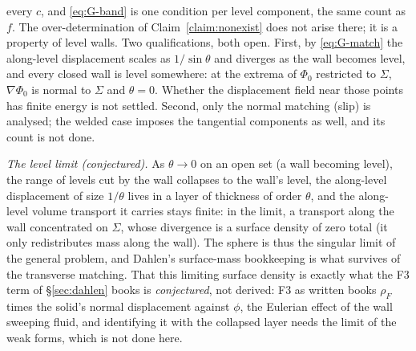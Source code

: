 \documentclass[11pt]{article}
\begin{document}
every $c$, and \eqref{eq:G-band} is one condition per level component,
the same count as $f$. The over-determination of
Claim~\ref{claim:nonexist} does not arise there; it is a property of
level walls. Two qualifications, both open. First, by
\eqref{eq:G-match} the along-level displacement scales as
$1/\sin\theta$ and diverges as the wall becomes level, and every closed
wall is level somewhere: at the extrema of $\Phi_0$ restricted to
$\Sigma$, $\nabla\Phi_0$ is normal to $\Sigma$ and $\theta = 0$. Whether
the displacement field near those points has finite energy is not
settled. Second, only the normal matching (slip) is analysed; the
welded case imposes the tangential components as well, and its count is
not done.

\emph{The level limit (conjectured).} As $\theta \to 0$ on an open set
(a wall becoming level), the range of levels cut by the wall collapses
to the wall's level, the along-level displacement of size $1/\theta$
lives in a layer of thickness of order $\theta$, and the along-level
volume transport it carries stays finite: in the limit, a transport
along the wall concentrated on $\Sigma$, whose divergence is a surface
density of zero total (it only redistributes mass along the wall). The
sphere is thus the singular limit of the general problem, and Dahlen's
surface-mass bookkeeping is what survives of the transverse matching.
That this limiting surface density is exactly what the F3 term of
\S\ref{sec:dahlen} books is \emph{conjectured}, not derived: F3 as
written books $\rho_F$ times the solid's normal displacement against
$\phi$, the Eulerian effect of the wall sweeping fluid, and identifying
it with the collapsed layer needs the limit of the weak forms, which is
not done here.
\end{document}
